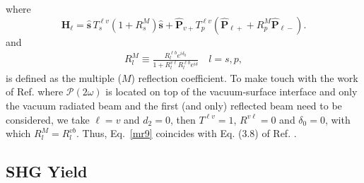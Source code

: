 \documentclass[10pt]{book}
\begin{document}
where
\begin{equation}\label{mr9}
\mathbf{H}_{\ell}
= \hat{\mathbf{s}}\,T_s^{\ell v}
\left(1+
R^M_s
\right)
\hat{\mathbf{s}}
+ \hat{\mathbf{P}}_{v+}T_{p}^{\ell v}
\left(
\hat{\mathbf{P}}_{\ell +} +
R^M_p
 \hat{\mathbf{P}}_{\ell -}
\right). 
\end{equation}
and
\begin{align}\label{m61}
R^M_l\equiv\frac{R^{\ell b}_le^{i\delta_0}}{1+R^{v\ell}_l R^{\ell b}_l e^{i\delta}}
\quad l=s,p
,
\end{align}
is defined as the multiple  ($M$) reflection coefficient.
To make touch with the work of Ref. \cite{mizrahiJOSA88} where
$\boldsymbol{\mathcal{P}}(2\omega)$ is located on top of the
vacuum-surface interface and only the vacuum radiated beam and the
first (and only) reflected beam need to be considered, we take
$\ell=v$ and $d_2=0$, then 
$T^{\ell v}=1$, $R^{v\ell}=0$ and $\delta_0=0$, with which
$R^M_l=R^{vb}_l$. 
Thus, Eq.~\eqref{mr9} coincides with Eq. (3.8) of
Ref. \cite{mizrahiJOSA88}. 

\subsection{SHG Yield}
\end{document}
